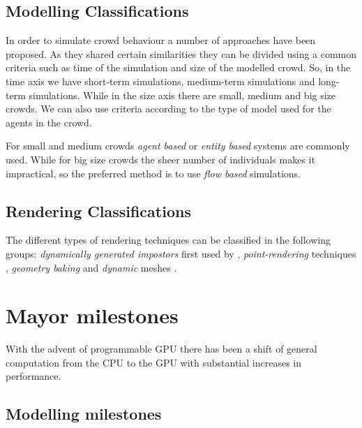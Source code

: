 \documentclass[conference]{acmsiggraph}
\begin{document}
\subsection{Modelling Classifications}

In order to simulate crowd behaviour a number of approaches have been proposed.
As they shared certain similarities they can be divided using a common criteria such as time of the simulation and size of the modelled crowd.
So, in the time axis we have short-term simulations, medium-term simulations and long-term simulations.
While in the size axis there are small, medium and big size crowds.
We can also use criteria according to the type of model used for the agents in the crowd.

For small and medium crowds \textit{agent based} or \textit{entity based} systems are commonly used.
While for big size crowds the sheer number of individuals makes it impractical, so the preferred method is to use \textit{flow based} simulations.

\subsection{Rendering Classifications}

The different types of rendering techniques can be classified in the following groups: \textit{dynamically generated impostors} first used by  \cite{Aubel2000}, \textit{point-rendering} techniques \cite{Wand2002}, \textit{geometry baking} \cite{Ulicny2004} and \textit{dynamic} meshes \cite{Ciechomski2005}.

%

\section{Mayor milestones}

With the advent of programmable GPU there has been a shift of general computation from the CPU to the GPU with substantial increases in performance.

\subsection{Modelling milestones}
\end{document}

